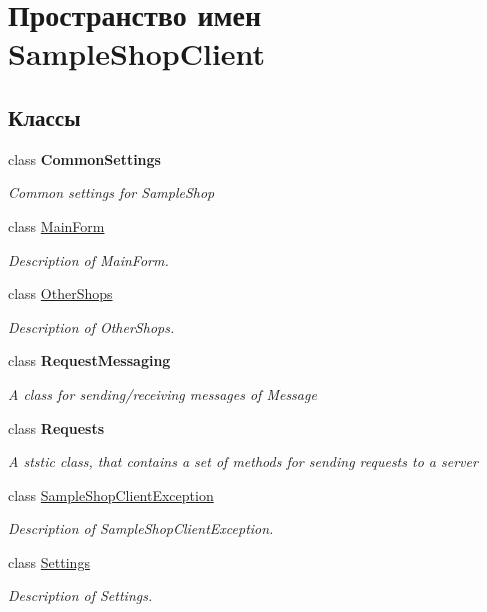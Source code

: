 \hypertarget{namespace_sample_shop_client}{}\section{Пространство имен Sample\+Shop\+Client}
\label{namespace_sample_shop_client}
\subsection*{Классы}
\begin{DoxyCompactItemize}
\item 
class {\bfseries Common\+Settings}
\begin{DoxyCompactList}\small\item\em Common settings for Sample\+Shop \end{DoxyCompactList}\item 
class \hyperlink{class_sample_shop_client_1_1_main_form}{Main\+Form}
\begin{DoxyCompactList}\small\item\em Description of Main\+Form. \end{DoxyCompactList}\item 
class \hyperlink{class_sample_shop_client_1_1_other_shops}{Other\+Shops}
\begin{DoxyCompactList}\small\item\em Description of Other\+Shops. \end{DoxyCompactList}\item 
class {\bfseries Request\+Messaging}
\begin{DoxyCompactList}\small\item\em A class for sending/receiving messages of Message \end{DoxyCompactList}\item 
class {\bfseries Requests}
\begin{DoxyCompactList}\small\item\em A ststic class, that contains a set of methods for sending requests to a server \end{DoxyCompactList}\item 
class \hyperlink{class_sample_shop_client_1_1_sample_shop_client_exception}{Sample\+Shop\+Client\+Exception}
\begin{DoxyCompactList}\small\item\em Description of Sample\+Shop\+Client\+Exception. \end{DoxyCompactList}\item 
class \hyperlink{class_sample_shop_client_1_1_settings}{Settings}
\begin{DoxyCompactList}\small\item\em Description of Settings. \end{DoxyCompactList}\end{DoxyCompactItemize}
